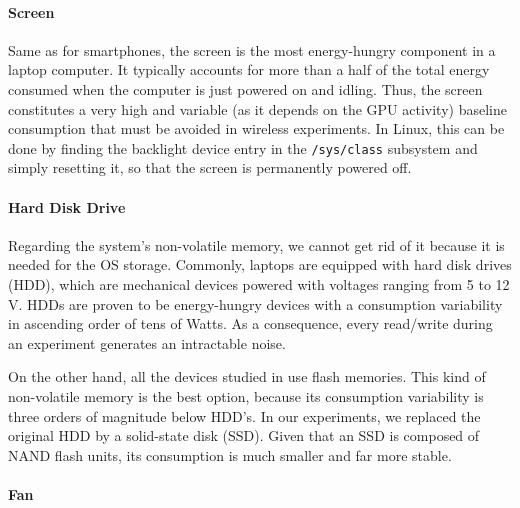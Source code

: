\documentclass[twoside,nohyper]{tufte-book}
\theoremstyle{definition}
\theoremstyle{definition}
\theoremstyle{definition}
\theoremstyle{remark}
\begin{document}
\paragraph{Screen}\label{screen}

Same as for
smartphones\cite[0pt]{Carroll2010},
the screen is the most energy-hungry component in a laptop computer. It
typically accounts for more than a half of the total energy consumed
when the computer is just powered on and idling. Thus, the screen
constitutes a very high and variable (as it depends on the GPU activity)
baseline consumption that must be avoided in wireless experiments. In
Linux, this can be done by finding the backlight device entry in the
\texttt{/sys/class} subsystem and simply resetting it, so that the
screen is permanently powered off.

\paragraph{Hard Disk Drive}\label{hard-disk-drive}

Regarding the system's non-volatile memory, we cannot get rid of it
because it is needed for the OS storage. Commonly, laptops are equipped
with hard disk drives (HDD), which are mechanical devices powered with
voltages ranging from 5 to 12 V. HDDs are proven to be energy-hungry
devices\cite[-1cm]{Hylick2008}
with a consumption variability in ascending order of tens of Watts. As a
consequence, every read/write during an experiment generates an
intractable noise.

On the other hand, all the devices studied in \citet{Serrano2014} use
flash memories. This kind of non-volatile memory is the best option,
because its consumption variability is three orders of magnitude below
HDD's\cite[0pt]{Grupp2009}.
In our experiments, we replaced the original HDD by a solid-state disk
(SSD). Given that an SSD is composed of NAND flash units, its
consumption is much smaller and far more stable.

\paragraph{Fan}\label{fan}
\end{document}
